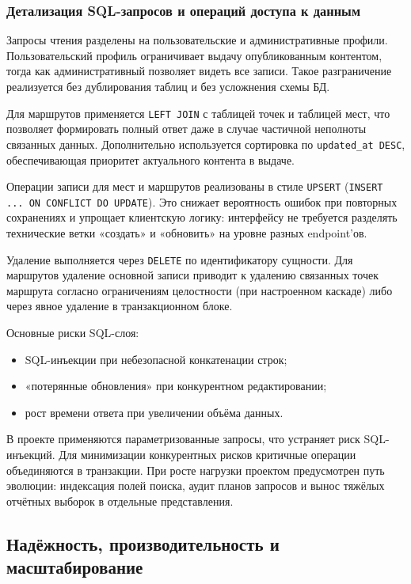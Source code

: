 \subsubsection{Детализация SQL-запросов и операций доступа к данным}
Запросы чтения разделены на пользовательские и административные профили.
Пользовательский профиль ограничивает выдачу опубликованным контентом, тогда как
административный позволяет видеть все записи. Такое разграничение реализуется
без дублирования таблиц и без усложнения схемы БД.

Для маршрутов применяется \texttt{LEFT JOIN} с таблицей точек и таблицей мест,
что позволяет формировать полный ответ даже в случае частичной неполноты связанных
данных. Дополнительно используется сортировка по \texttt{updated\_at DESC},
обеспечивающая приоритет актуального контента в выдаче.

Операции записи для мест и маршрутов реализованы в стиле \texttt{UPSERT}
(\texttt{INSERT ... ON CONFLICT DO UPDATE}). Это снижает вероятность ошибок при
повторных сохранениях и упрощает клиентскую логику: интерфейсу не требуется
разделять технические ветки «создать» и «обновить» на уровне разных endpoint'ов.

Удаление выполняется через \texttt{DELETE} по идентификатору сущности.
Для маршрутов удаление основной записи приводит к удалению связанных точек
маршрута согласно ограничениям целостности (при настроенном каскаде) либо через
явное удаление в транзакционном блоке.

Основные риски SQL-слоя:
\begin{itemize}
	\item SQL-инъекции при небезопасной конкатенации строк;
	\item «потерянные обновления» при конкурентном редактировании;
	\item рост времени ответа при увеличении объёма данных.
\end{itemize}

В проекте применяются параметризованные запросы, что устраняет риск SQL-инъекций.
Для минимизации конкурентных рисков критичные операции объединяются в транзакции.
При росте нагрузки проектом предусмотрен путь эволюции: индексация полей поиска,
аудит планов запросов и вынос тяжёлых отчётных выборок в отдельные представления.

\subsection{Надёжность, производительность и масштабирование}

